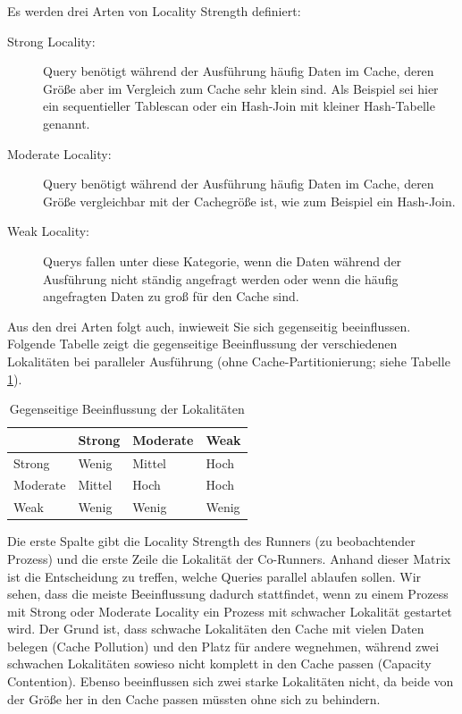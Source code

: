 Es werden drei Arten von Locality Strength definiert:
\begin{description}
\item[Strong Locality:] Query benötigt während der Ausführung häufig Daten im Cache, deren Größe aber im Vergleich zum Cache sehr klein sind. Als Beispiel sei hier ein sequentieller Tablescan oder ein Hash-Join mit kleiner Hash-Tabelle genannt. 
\item[Moderate Locality:] Query benötigt während der Ausführung häufig Daten im Cache, deren Größe vergleichbar mit der Cachegröße ist, wie zum Beispiel ein Hash-Join.
\item[Weak Locality:] Querys fallen unter diese Kategorie, wenn die Daten während der Ausführung nicht ständig angefragt werden oder wenn die häufig angefragten Daten zu groß für den Cache sind.
\end{description}

Aus den drei Arten folgt auch, inwieweit Sie sich gegenseitig beeinflussen. Folgende Tabelle zeigt die gegenseitige Beeinflussung der verschiedenen Lokalitäten bei paralleler Ausführung (ohne Cache-Partitionierung; siehe Tabelle \ref{mcc_locality}).\\

\begin{table}[h]
	\centering
	\begin{tabular}{|l|l|l|l|} \hline
 & Strong & Moderate & Weak \\ \hline
Strong & Wenig & Mittel & Hoch \\ \hline
Moderate & Mittel & Hoch & Hoch \\ \hline
Weak & Wenig & Wenig & Wenig \\ \hline
	\end{tabular}
	\caption{Gegenseitige Beeinflussung der Lokalitäten}
	\label{mcc_locality}
\end{table}

Die erste Spalte gibt die Locality Strength des Runners (zu beobachtender Prozess) und die erste Zeile die Lokalität der Co-Runners. Anhand dieser Matrix ist die Entscheidung zu treffen, welche Queries parallel ablaufen sollen. Wir sehen, dass die meiste Beeinflussung dadurch stattfindet, wenn zu einem Prozess mit Strong oder Moderate Locality ein Prozess mit schwacher Lokalität gestartet wird.
Der Grund ist, dass schwache Lokalitäten den Cache mit vielen Daten belegen (Cache Pollution) und den Platz für andere wegnehmen, während zwei schwachen Lokalitäten sowieso nicht komplett in den Cache passen (Capacity Contention). Ebenso beeinflussen sich zwei starke Lokalitäten nicht, da beide von der Größe her in den Cache passen müssten ohne sich zu behindern.

